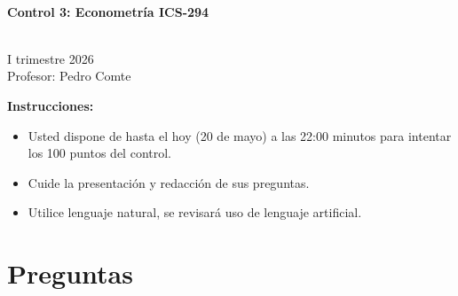 \documentclass[10pt,a4paper]{article}
\begin{document}
\vspace{5cm}



\begin{center}
\begin{large}
\textbf{\\Control 3: Econometría ICS-294}
\end{large}\\
\vspace{0.2cm}
I trimestre 2026\\
Profesor: Pedro Comte\\
\end{center}

\textbf{Instrucciones:} 

\begin{itemize}

    \item Usted dispone de hasta el hoy (20 de mayo) a las 22:00 minutos  para intentar los 100 puntos del control.
    \item Cuide la presentación y redacción de sus preguntas.
    \item Utilice lenguaje natural, se revisará uso de lenguaje artificial.
     
\end{itemize}

\section{Preguntas}
\end{document}
